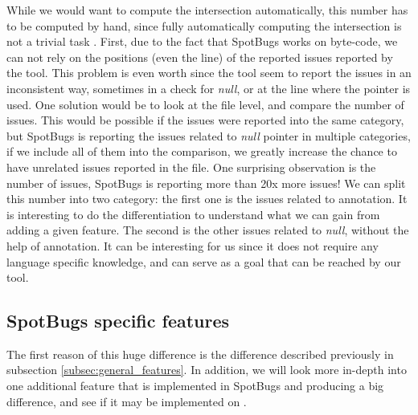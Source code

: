 While we would want to compute the intersection automatically, this number has to be computed by hand, since fully automatically computing the intersection is not a trivial task \cite{Gabel:2010:OIE:1806799.1806806}. 
First, due to the fact that SpotBugs works on byte-code, we can not rely on the positions (even the line) of the reported issues reported by the tool. 
This problem is even worth since the tool seem to report the issues in an inconsistent way, sometimes in a check for \emph{null}, or at the line where the pointer is used. 
One solution would be to look at the file level, and compare the number of issues. 
This would be possible if the issues were reported into the same category, but SpotBugs is reporting the issues related to \emph{null} pointer in multiple categories, if we include all of them into the comparison, we greatly increase the chance to have unrelated issues reported in the file. \newline
One surprising observation is the number of issues, SpotBugs is reporting more than 20x more issues! 
We can split this number into two category: the first one is the issues related to annotation. 
It is interesting to do the differentiation to understand what we can gain from adding a given feature. 
The second is the other issues related to \emph{null}, without the help of annotation. 
It can be interesting for us since it does not require any language specific knowledge, and can serve as a goal that can be reached by our tool.

\subsection{SpotBugs specific features}
\label{subsec:spotbugs_specific}

The first reason of this huge difference is the difference described previously in subsection \ref{subsec:general_features}.
In addition, we will look more in-depth into one additional feature that is implemented in SpotBugs and producing a big difference, and see if it may be implemented on \slang{}.

